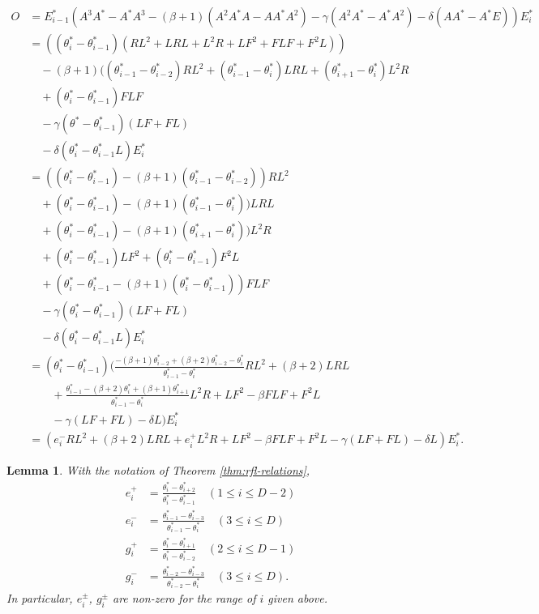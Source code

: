 \documentclass[
]{book}
\newtheorem{lemma}{Lemma}[chapter]
\theoremstyle{definition}
\theoremstyle{definition}
\theoremstyle{definition}
\theoremstyle{definition}
\theoremstyle{remark}
\begin{document}
\begin{align}
O & = E^*_{i-1}(A^3A^*-A^*A^3-(\beta+1)(A^2A^*A-AA^*A^2)-\gamma(A^2A^*-A^*A^2)-\delta(AA^*-A^*E))E^*_i\\
& = ((\theta^*_i-\theta^*_{i-1})(RL^2+ LRL + L^2R + LF^2 + FLF + F^2L))\\
& \quad -(\beta+1)((\theta^*_{i-1}-\theta^*_{i-2})RL^2 + (\theta^*_{i-1}-\theta^*_i)LRL + (\theta^*_{i+1}-\theta^*_i)L^2R\\
& \quad + (\theta^*_i-\theta^*_{i-1})FLF\\
& \quad - \gamma(\theta^*-\theta^*_{i-1})(LF+FL)\\
& \quad - \delta(\theta^*_i-\theta^*_{i-1}L)E^*_i\\
& = ((\theta^*_i-\theta^*_{i-1})-(\beta+1)(\theta^*_{i-1}-\theta^*_{i-2}))RL^2 \\
& \quad + (\theta^*_i-\theta^*_{i-1})-(\beta+1)(\theta^*_{i-1}-\theta^*_{i}))LRL\\
& \quad + (\theta^*_i-\theta^*_{i-1})-(\beta+1)(\theta^*_{i+1}-\theta^*_{i}))L^2R\\
& \quad + (\theta^*_{i}-\theta^*_{i-1})LF^2 + (\theta^*_i-\theta^*_{i-1})F^2L\\
& \quad + (\theta^*_i - \theta^*_{i-1}-(\beta+1)(\theta^*_i-\theta^*_{i-1}))FLF\\
& \quad - \gamma(\theta^*_i-\theta^*_{i-1})(LF+FL)\\
& \quad - \delta (\theta^*_i-\theta^*_{i-1}L)E^*_i\\
& = (\theta^*_i-\theta^*_{i-1})\biggl(\frac{-(\beta+1)\theta^*_{i-2}+(\beta+2)\theta^*_{i-2}-\theta^*_i}{\theta^*_{i-1}-\theta^*_i}RL^2+(\beta+2)LRL\\
& \qquad + \frac{\theta^*_{i-1}-(\beta+2)\theta^*_i+(\beta+1)\theta^*_{i+1}}{\theta^*_{i-1}-\theta^*_i}L^2R + LF^2 - \beta FLF + F^2L\\
& \qquad -\gamma(LF+FL) - \delta L\biggr)E^*_i\\
& = (e^-_iRL^2 + (\beta+2)LRL + e^+_iL^2R + LF^2 - \beta FLF + F^2L-\gamma(LF+FL)-\delta L)E^*_i.
\end{align}

\begin{lemma}
\protect\hypertarget{lem:epm-gpm}{}\label{lem:epm-gpm}With the notation of Theorem \ref{thm:rfl-relations},
\begin{align}
e^+_i & = \frac{\theta^*_i-\theta^*_{i+2}}{\theta^*_i-\theta^*_{i-1}} \quad (1\leq i\leq D-2)\\
e^-_i & = \frac{\theta^*_{i-1}-\theta^*_{i-3}}{\theta^*_{i-1}-\theta^*_{i}} \quad (3\leq i\leq D)\\
g^+_i & = \frac{\theta^*_i-\theta^*_{i+1}}{\theta^*_i-\theta^*_{i-2}} \quad (2\leq i\leq D-1)\\
g^-_i & = \frac{\theta^*_{i-2}-\theta^*_{i-3}}{\theta^*_{i-2}-\theta^*_{i}} \quad (3\leq i\leq D).
\end{align}
In particular, \(e^\pm_i\), \(g^\pm_i\) are non-zero for the range of \(i\) given above.
\end{lemma}
\end{document}

